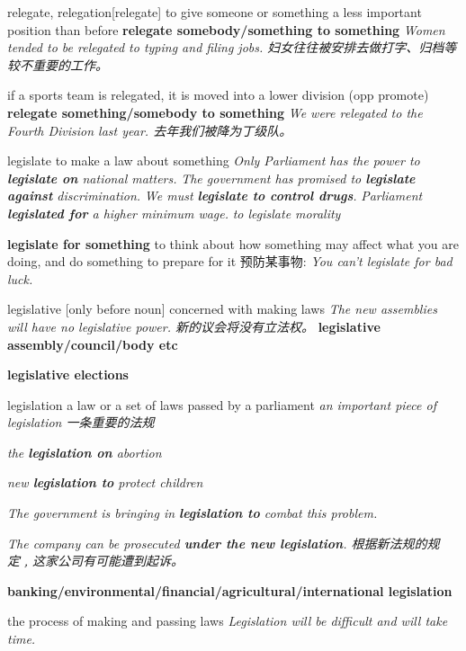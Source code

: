 \begin{DefWord}{relegate, relegation}[relegate]
    to give someone or something a less important position than before
    \textbf{relegate somebody/something to something}
    \textit{Women tended to be relegated to typing and filing jobs. 妇女往往被安排去做打字、归档等较不重要的工作。}

    if a sports team is relegated, it is moved into a lower division (opp  promote)
    \textbf{relegate something/somebody to something}
    \textit{We were relegated to the Fourth Division last year. 去年我们被降为丁级队。}
\end{DefWord}

\begin{DefWord}{legislate}
    to make a law about something
    \textit{Only Parliament has
     the power to \textbf{legislate on} national matters.}
     \textit{The government has promised to \textbf{legislate against} discrimination.}
     \textit{We must \textbf{legislate to control drugs}.}
    \textit{Parliament \textbf{legislated for} a higher minimum wage.}
    \textit{to legislate morality}

    \textbf{legislate for something} to think about how something may affect what you are doing, and do something to prepare for it 预防某事物:
    \textit{You can't legislate for bad luck.}
    
\end{DefWord}

\begin{DefWord}{legislative}
   [only before noun] concerned with making laws
   \textit{The new assemblies will have no legislative power. 新的议会将没有立法权。}
    \textbf{legislative assembly/council/body etc}

    \textbf{legislative elections}
\end{DefWord}

\begin{DefWord}{legislation}
    a law or a set of laws passed by a parliament
    \textit{an important piece of legislation 一条重要的法规}

    \textit{the \textbf{legislation on} abortion}

    \textit{new \textbf{legislation to }protect children}

    \textit{The government is bringing in \textbf{legislation to} combat this problem.}

    \textit{The company can be prosecuted \textbf{under the new legislation}. 根据新法规的规定﹐这家公司有可能遭到起诉。}

    \textbf{banking/environmental/financial/agricultural/international legislation}

    the process of making and passing laws
    \textit{Legislation will be difficult and will take time.}
\end{DefWord}

